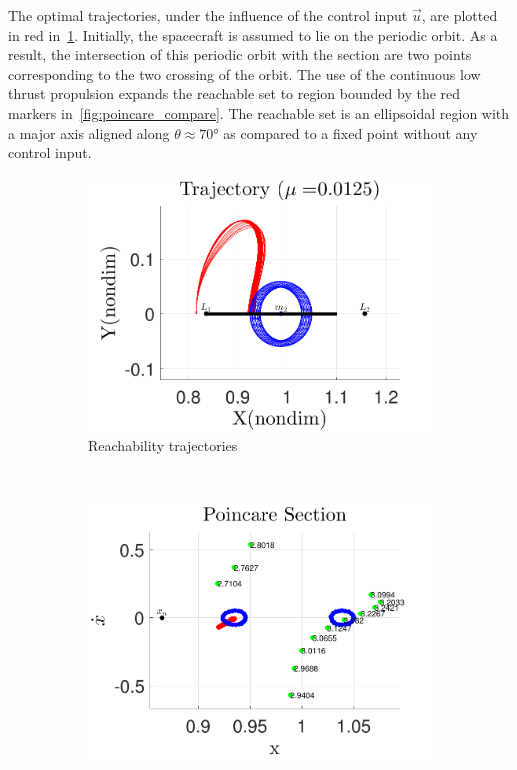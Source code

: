 \documentclass[preprint]{elsarticle}
\begin{document}
The optimal trajectories, under the influence of the control input \( \vec{u} \), are plotted in red in~\cref{fig:reach_trajectory}.
Initially, the spacecraft is assumed to lie on the periodic orbit.
As a result, the intersection of this periodic orbit with the \Poincare section are two points corresponding to the two crossing of the orbit.
The use of the continuous low thrust propulsion expands the reachable set to region bounded by the red markers in~\cref{fig:poincare_compare}.
The reachable set is an ellipsoidal region with a major axis aligned along \( \theta \approx \ang{70} \) as compared to a fixed point without any control input.
\begin{figure} 
	\centering 
	\begin{subfigure}[htbp]{0.5\textwidth} 
		\includegraphics[width=\textwidth]{reach_trajectory} 
		\caption{Reachability trajectories} \label{fig:reach_trajectory} 
	\end{subfigure}~ %
	\begin{subfigure}[htbp]{0.5\textwidth} 
		\includegraphics[width=\textwidth]{poincare_compare} 

\end{subfigure}
\end{figure}
\end{document}
